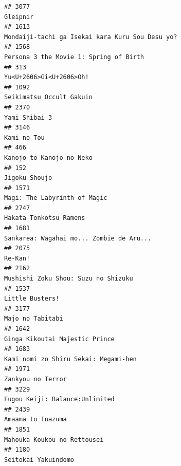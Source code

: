 \documentclass[
]{article}
\begin{document}
\begin{verbatim}
## 3077                                                                                                  Gleipnir
## 1613                                                           Mondaiji-tachi ga Isekai kara Kuru Sou Desu yo?
## 1568                                                                    Persona 3 the Movie 1: Spring of Birth
## 313                                                                                    Yu<U+2606>Gi<U+2606>Oh!
## 1092                                                                                  Seikimatsu Occult Gakuin
## 2370                                                                                             Yami Shibai 3
## 3146                                                                                               Kami no Tou
## 466                                                                                   Kanojo to Kanojo no Neko
## 152                                                                                              Jigoku Shoujo
## 1571                                                                              Magi: The Labyrinth of Magic
## 2747                                                                                    Hakata Tonkotsu Ramens
## 1681                                                                  Sankarea: Wagahai mo... Zombie de Aru...
## 2075                                                                                                   Re-Kan!
## 2162                                                                       Mushishi Zoku Shou: Suzu no Shizuku
## 1537                                                                                           Little Busters!
## 3177                                                                                          Majo no Tabitabi
## 1642                                                                            Ginga Kikoutai Majestic Prince
## 1683                                                                      Kami nomi zo Shiru Sekai: Megami-hen
## 1971                                                                                         Zankyou no Terror
## 3229                                                                            Fugou Keiji: Balance:Unlimited
## 2439                                                                                         Amaama to Inazuma
## 1851                                                                               Mahouka Koukou no Rettousei
## 1180                                                                                       Seitokai Yakuindomo

\end{verbatim}
\end{document}
